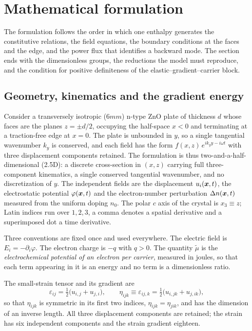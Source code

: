 \section{Mathematical formulation}
\label{sec:governing}

The formulation follows the order in which one enthalpy generates the constitutive relations, the field equations, the boundary conditions at the faces and the edge, and the power flux that identifies a backward mode.  The section ends with the dimensionless groups, the reductions the model must reproduce, and the condition for positive definiteness of the elastic--gradient--carrier block.

\subsection{Geometry, kinematics and the gradient energy}
\label{sec:governing_variational}
\label{sec:governing_kinematics}

Consider a transversely isotropic ($6mm$) n-type ZnO plate of thickness $d$
whose faces are the planes $z=\pm d/2$, occupying the half-space $x<0$ and
terminating at a traction-free edge at $x=0$.  The plate is unbounded in $y$, so
a single tangential wavenumber $k_y$ is conserved, and each field has the form
$f(x,z)\,e^{ik_yy-i\omega t}$ with three displacement components retained.  The formulation is thus two-and-a-half-dimensional (2.5D): a discrete
cross-section in $(x,z)$ carrying full three-component kinematics, a single
conserved tangential wavenumber, and no discretization of $y$.  The independent fields are
the displacement $u_i(\boldsymbol{x},t)$, the electrostatic potential
$\varphi(\boldsymbol{x},t)$ and the electron-number perturbation
$\Delta n(\boldsymbol{x},t)$ measured from the uniform doping $n_0$.  The polar $c$
axis of the crystal is $x_3\equiv z$; Latin indices run over $1,2,3$, a comma
denotes a spatial derivative and a superimposed dot a time derivative.

Three conventions are fixed once and used everywhere.  The electric field is
$E_i=-\partial_i\varphi$.  The electron charge is $-q$ with $q>0$.  The
quantity $\widetilde\mu$ is the \emph{electrochemical potential of an electron
per carrier}, measured in joules, so that each term appearing in it is an
energy and no term is a dimensionless ratio.


The small-strain tensor and its gradient are
\begin{equation}
\label{eq:strain}
\varepsilon_{ij}=\tfrac12\bigl(u_{i,j}+u_{j,i}\bigr),
\qquad
\eta_{ijk}\equiv\varepsilon_{ij,k}=\tfrac12\bigl(u_{i,jk}+u_{j,ik}\bigr),
\end{equation}
so that $\eta_{ijk}$ is symmetric in its first two indices,
$\eta_{ijk}=\eta_{jik}$, and has the dimension of an inverse length.
All three displacement components are retained; the strain has six independent
components and the strain gradient eighteen.

